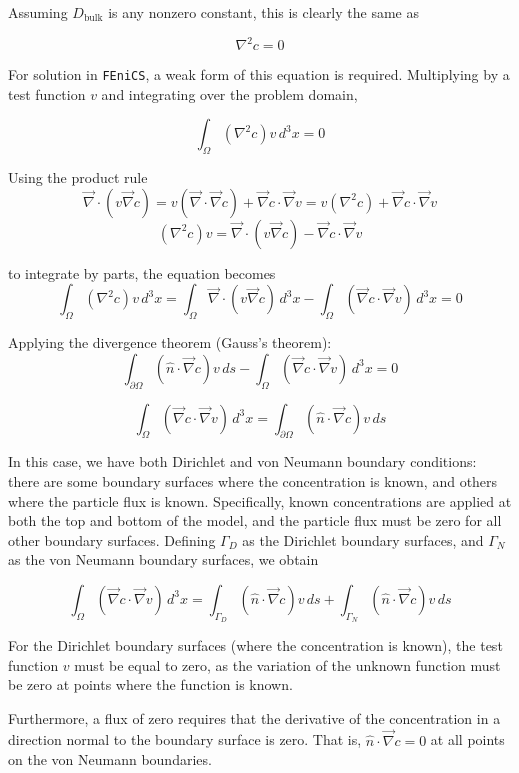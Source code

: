 \documentclass{article}
\begin{document}
Assuming $D_{\text{bulk}}$ is any nonzero constant, this is clearly the same as

$$ \nabla^2 c = 0$$

For solution in \texttt{FEniCS}, a weak form of this equation is required.
Multiplying by a test function $v$ and integrating over the problem domain,

$$\int_{\Omega} \left(\nabla^2 c \right) v \,d^3x = 0$$

Using the product rule
$$\vec{\nabla} \cdot \left( v \vec{\nabla} c \right) =
v \left(\vec{\nabla} \cdot \vec{\nabla} c \right) + \vec{\nabla}c \cdot \vec{\nabla}v =
v \left(\nabla^2 c \right) + \vec{\nabla}c \cdot \vec{\nabla}v$$
$$\left(\nabla^2 c \right) v =
\vec{\nabla} \cdot \left( v \vec{\nabla} c \right) - \vec{\nabla}c \cdot \vec{\nabla}v$$

to integrate by parts, the equation becomes
$$ \int_{\Omega} \left(\nabla^2 c \right) v \,d^3x =
\int_{\Omega} \vec{\nabla} \cdot \left( v \vec{\nabla} c \right) \,d^3x
- \int_{\Omega} \left( \vec{\nabla}c \cdot \vec{\nabla}v \right) \,d^3x =0$$

Applying the divergence theorem (Gauss's theorem):
$$\int_{\partial\Omega} \left( \hat{n} \cdot \vec{\nabla} c \right) v\,ds
- \int_{\Omega} \left( \vec{\nabla}c \cdot \vec{\nabla}v \right) \,d^3x = 0$$

$$\int_{\Omega} \left( \vec{\nabla}c \cdot \vec{\nabla}v \right) \,d^3x =
\int_{\partial\Omega} \left( \hat{n} \cdot \vec{\nabla} c \right) v\,ds$$

In this case, we have both Dirichlet and von Neumann boundary conditions:
there are some boundary surfaces where the concentration is known,
and others where the particle flux is known.
Specifically, known concentrations are applied at both the top and bottom of the model,
and the particle flux must be zero for all other boundary surfaces.
Defining $\Gamma_D$ as the Dirichlet boundary surfaces,
and $\Gamma_N$ as the von Neumann boundary surfaces, we obtain

$$\int_{\Omega} \left( \vec{\nabla}c \cdot \vec{\nabla}v \right) \,d^3x =
\int_{\Gamma_D} \left( \hat{n} \cdot \vec{\nabla} c \right) v\,ds
+\int_{\Gamma_N} \left( \hat{n} \cdot \vec{\nabla} c \right) v\,ds$$

For the Dirichlet boundary surfaces (where the concentration is known),
the test function $v$ must be equal to zero,
as the variation of the unknown function must be zero at points where the function is known.

Furthermore, a flux of zero requires that the derivative of the concentration in a direction
normal to the boundary surface is zero.
That is, $\hat{n} \cdot \vec{\nabla} c = 0$ at all points on the von Neumann boundaries.
\end{document}
